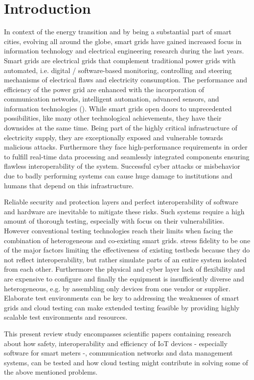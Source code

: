 \section{Introduction}
In context of the energy transition and by being a substantial part of smart cities, evolving all around the globe, smart grids have gained increased focus in information technology and electrical engineering research during the last years. Smart grids are electrical grids that complement traditional power grids with automated, i.e. digital / software-based monitoring, controlling and steering mechanisms of electrical flaws and electricity consumption. The performance and efficiency of the power grid are enhanced with the incorporation of communication networks, intelligent automation, advanced sensors, and information technologies (\citeauthor{smadi2021comprehensive}). While smart grids open doors to unprecedented possibilities, like many other technological achievements, they have their downsides at the same time. Being part of the highly critical infrastructure of electricity supply, they are exceptionally exposed and vulnerable towards malicious attacks. Furthermore they face high-performance requirements in order to fulfill real-time data processing and seamlessly integrated components ensuring flawless interoperability of the system. Successful cyber attacks or misbehavior due to badly performing systems can cause huge damage to institutions and humans that depend on this infrastructure.

Reliable security and protection layers and perfect interoperability of software and hardware are inevitable to mitigate these risks. Such systems require a high amount of thorough testing, especially with focus on their vulnerabilities. However conventional testing technologies reach their limits when facing the combination of heterogeneous and co-existing smart grids. \citeauthor{smadi2021comprehensive} stress fidelity to be one of the major factors limiting the effectiveness of existing testbeds because they do not reflect interoperability, but rather simulate parts of an entire system isolated from each other. Furthermore the physical and cyber layer lack of flexibility and are expensive to configure and finally the equipment is insufficiently diverse and heterogeneous, e.g. by assembling only devices from one vendor or supplier. Elaborate test environments can be key to addressing the weaknesses of smart grids and cloud testing can make extended testing feasible by providing highly scalable test environments and resources.

This present review study encompasses scientific papers containing research about how safety, interoperability and efficiency of IoT devices - especially software for smart meters -, communication networks and data management systems, can be tested and how cloud testing might contribute in solving some of the above mentioned problems.
